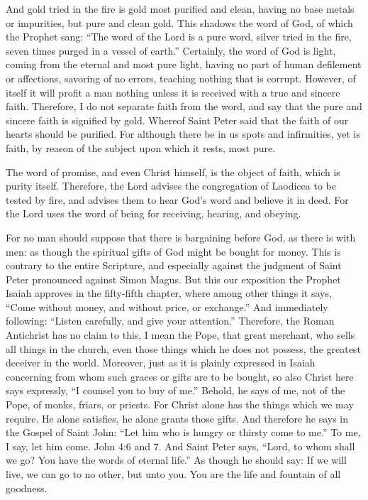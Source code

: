And gold tried in the fire is gold most purified and clean, having no base metals or impurities, but pure and clean gold. This shadows the word of God, of which the Prophet sang: “The word of the Lord is a pure word, silver tried in the fire, seven times purged in a vessel of earth.” Certainly, the word of God is light, coming from the eternal and most pure light, having no part of human defilement or affections, savoring of no errors, teaching nothing that is corrupt. However, of itself it will profit a man nothing unless it is received with a true and sincere faith. Therefore, I do not separate faith from the word, and say that the pure and sincere faith is signified by gold. Whereof Saint Peter said that the faith of our hearts should be purified. For although there be in us spots and infirmities, yet is faith, by reason of the subject upon which it rests, most pure.

The word of promise, and even Christ himself, is the object of faith, which is purity itself. Therefore, the Lord advises the congregation of Laodicea to be tested by fire, and advises them to hear God’s word and believe it in deed. For the Lord uses the word of being for receiving, hearing, and obeying.

For no man should suppose that there is bargaining before God, as there is with men: as though the spiritual gifts of God might be bought for money. This is contrary to the entire Scripture, and especially against the judgment of Saint Peter pronounced against Simon Magus. But this our exposition the Prophet Isaiah approves in the fifty-fifth chapter, where among other things it says, “Come without money, and without price, or exchange.” And immediately following: “Listen carefully, and give your attention.” Therefore, the Roman Antichrist has no claim to this, I mean the Pope, that great merchant, who sells all things in the church, even those things which he does not possess, the greatest deceiver in the world. Moreover, just as it is plainly expressed in Isaiah concerning from whom such graces or gifts are to be bought, so also Christ here says expressly, “I counsel you to buy of me.” Behold, he says of me, not of the Pope, of monks, friars, or priests. For Christ alone has the things which we may require. He alone satisfies, he alone grants those gifts. And therefore he says in the Gospel of Saint John: “Let him who is hungry or thirsty come to me.” To me, I say, let him come. John 4:6 and 7. And Saint Peter says, “Lord, to whom shall we go? You have the words of eternal life.” As though he should say: If we will live, we can go to no other, but unto you. You are the life and fountain of all goodness.

